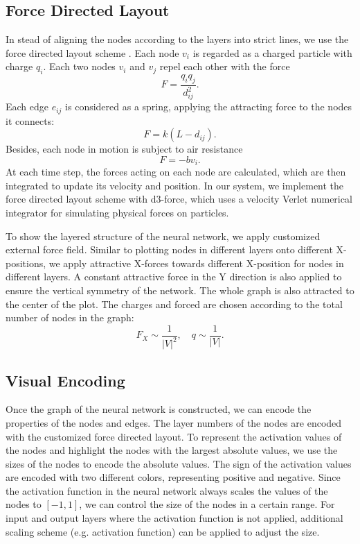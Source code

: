 \documentclass[sigchi]{acmart}
\begin{document}
\subsection{Force Directed Layout}
In stead of aligning the nodes according to the layers into strict lines, we use the force directed layout scheme \cite{fruchterman1991graph}. Each node $v_i$ is regarded as a charged particle with charge $q_i$. Each two nodes $v_i$ and $v_j$ repel each other with the force
\[
F = \frac{q_i q_j}{d_{ij}^2}.
\]
Each edge $e_{ij}$ is considered as a spring, applying the attracting force to the nodes it connects:
\[
F = k(L - d_{ij}).
\]
Besides, each node in motion is subject to air resistance
\[
F = -b v_i.
\]
At each time step, the forces acting on each node are calculated, which are then integrated to update its velocity and position. In our system, we implement the force directed layout scheme with d3-force, which uses a velocity Verlet numerical integrator for simulating physical forces on particles. 

To show the layered structure of the neural network, we apply customized external force field. Similar to plotting nodes in different layers onto different X-positions, we apply attractive X-forces towards different X-position for nodes in different layers. A constant attractive force in the Y direction is also applied to ensure the vertical symmetry of the network. The whole graph is also attracted to the center of the plot. The charges and forced are chosen according to the total number of nodes in the graph:
\[
F_X \sim \frac{1}{|V|^2}, \quad q \sim \frac{1}{|V|}.
\]

\subsection{Visual Encoding}
Once the graph of the neural network is constructed, we can encode the properties of the nodes and edges. The layer numbers of the nodes are encoded with the customized force directed layout. To represent the activation values of the nodes and highlight the nodes with the largest absolute values, we use the sizes of the nodes to encode the absolute values. The sign of the activation values are encoded with two different colors, representing positive and negative. Since the activation function in the neural network always scales the values of the nodes to $[-1,1]$, we can control the size of the nodes in a certain range. For input and output layers where the activation function is not applied, additional scaling scheme (e.g. activation function) can be applied to adjust the size.
\end{document}
